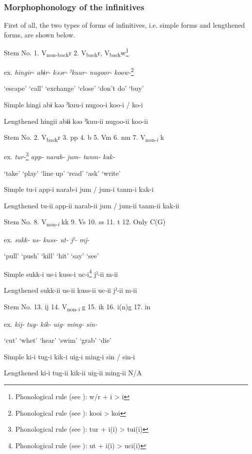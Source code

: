\subsubsection{Morphophonology of the infinitives}

First of all, the two types of forms of infinitives, i.e. simple forms and lengthened forms, are shown below.

\begin{table}
\caption{\label{tab:key:80}. Infinitives (simple forms and lengthened forms)}

Stem No.  1. V\textsubscript{non-back}r  2. V\textsubscript{back}r, V\textsubscript{back}w\footnote{Phonological rule (see ): w/r + i > i}

ex.  \textit{hingir-}  \textit{abɨr-}  \textit{kəər-}  \textit{ˀkuur-}  \textit{nugoor-}  \textit{koow-}\footnote{Phonological rule (see ): kooi > koi}

  ‘escape’  ‘call’  ‘exchange’  ‘close’  ‘don’t do’  ‘buy’

Simple  hingi  abɨ  kəə  ˀkuu-i  nugoo-i  koo-i / ko-i

Lengthened  hingii  abɨɨ  kəə  ˀkuu-ii  nugoo-ii  koo-ii

Stem No.  2. V\textsubscript{back}r  3. pp  4. b  5. Vm  6. nm  7. V\textsubscript{non-}\textit{\textsubscript{i} }k

ex.  \textit{tur-}\footnote{Phonological rule (see ): tur + i(i) > tui(i)}  \textit{app-}  \textit{narab-}  \textit{jum-}  \textit{tanm-}  \textit{kak-}

  ‘take’  ‘play’  ‘line up’  ‘read’  ‘ask’  ‘write’

Simple  tu-i  app-i  narab-i  jum / jum-i  tanm-i  kak-i

Lengthened  tu-ii  app-ii  narab-ii  jum / jum-ii  tanm-ii  kak-ii

Stem No.  8. V\textsubscript{non-}\textit{\textsubscript{i} }kk  9. Vs  10. ss  11. t  12. Only C(G)

ex.  \textit{sukk-}  \textit{us-}  \textit{kuss-}  \textit{ut-}  \textit{jˀ-}  \textit{mj-}

  ‘pull’  ‘push’  ‘kill’  ‘hit’  ‘say’  ‘see’

Simple  sukk-i  us-i  kuss-i  uc-i\footnote{Phonological rule (see ): ut + i(i) > uci(i)}  jˀ-ii  m-ii

Lengthened  sukk-ii  us-ii  kuss-ii  uc-ii  jˀ-ii  m-ii

Stem No.  13. ij  14. V\textsubscript{non-}\textit{\textsubscript{i}} g  15. ik  16. i(n)g    17. in

ex.  \textit{kij-}  \textit{tug-}  \textit{kik-}  \textit{uig-}  \textit{ming-}  \textit{sin-}

  ‘cut’  ‘whet’  ‘hear’  ‘swim’  ‘grab’  ‘die’

Simple  ki-i  tug-i  kik-i  uig-i  ming-i  sin / sin-i

Lengthened  ki-i  tug-ii  kik-ii  uig-ii  ming-ii  N/A
\end{table}

